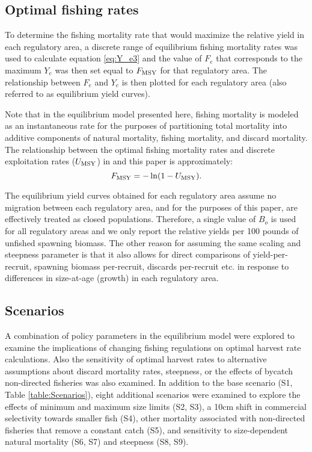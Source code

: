 \subsection*{Optimal fishing rates} %
\label{sub:optimal_fishing_rates}
To determine the fishing mortality rate that would maximize the relative yield in each regulatory area, a discrete range of equilibrium fishing mortality rates was used to calculate equation \eqref{eq:Y_e3} and the value of $F_e$ that corresponds to the maximum $Y_e$ was then set equal to $F_{\rm{MSY}}$ for that regulatory area. The relationship between $F_e$ and $Y_e$ is then plotted for each regulatory area (also referred to as equilibrium yield curves). 

Note that in the equilibrium model presented here, fishing mortality is modeled as an instantaneous rate for the purposes of partitioning total mortality  into additive components of natural mortality, fishing mortality, and discard mortality.  The relationship between the optimal fishing mortality rates and discrete exploitation rates ($U_{\rm{MSY}}$) in \cite{clark2006assessment} and this paper is approximately:
\[
F_{\rm{MSY}} = -\ln(1-U_{\rm{MSY}}).
\]

The equilibrium yield curves obtained for each regulatory area assume no migration between each regulatory area, and for the purposes of this paper, are effectively treated as closed populations.  Therefore, a single value of $B_o$ is used for all regulatory areas and we only report the relative yields per 100 pounds of unfished spawning biomass.  The other reason for assuming the same scaling and steepness parameter is that it also allows for direct  comparisons of yield-per-recruit, spawning biomass per-recruit, discards per-recruit etc. in response to differences in size-at-age (growth) in each regulatory area.


\subsection*{Scenarios} %
\label{sub:scenarios}

A combination of policy parameters in the equilibrium model were explored to examine the implications of changing fishing regulations on optimal harvest rate calculations.  Also the sensitivity of optimal harvest rates to alternative assumptions about discard mortality rates, steepness, or the effects of bycatch non-directed fisheries was also examined.  In addition to the base scenario (S1, Table \ref{table:Scenarios}), eight additional scenarios were examined to explore the effects of minimum and maximum size limits (S2, S3), a 10cm shift in commercial selectivity towards smaller fish (S4), other mortality associated with non-directed fisheries that remove a constant catch (S5), and sensitivity to size-dependent natural mortality (S6, S7) and steepness (S8, S9).



